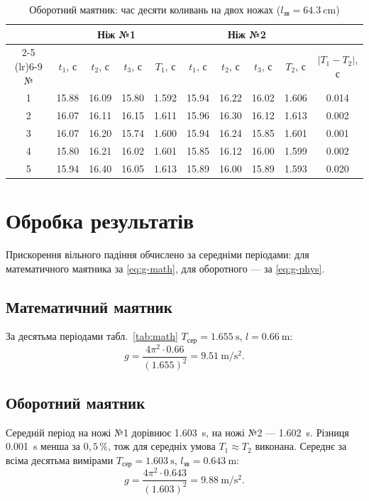 \documentclass[ukrainian]{ucaphyslab}
\begin{document}
\begin{table}[H]
  \centering
  \small
  \setlength{\tabcolsep}{4pt}
  \begin{tabular}{@{}c ccc c ccc c c@{}}
    \toprule
    & \multicolumn{4}{c}{Ніж №1} & \multicolumn{4}{c}{Ніж №2} & \\
    \cmidrule(lr){2-5} \cmidrule(lr){6-9}
    № & \(t_1\), с & \(t_2\), с & \(t_3\), с & \(T_1\), с
      & \(t_1\), с & \(t_2\), с & \(t_3\), с & \(T_2\), с
      & \(|T_1-T_2|\), с \\
    \midrule
    1 & 15.88 & 16.09 & 15.80 & 1.592 & 15.94 & 16.22 & 16.02 & 1.606 & 0.014 \\
    2 & 16.07 & 16.11 & 16.15 & 1.611 & 15.96 & 16.30 & 16.12 & 1.613 & 0.002 \\
    3 & 16.07 & 16.20 & 15.74 & 1.600 & 15.94 & 16.24 & 15.85 & 1.601 & 0.001 \\
    4 & 15.80 & 16.21 & 16.02 & 1.601 & 15.85 & 16.12 & 16.00 & 1.599 & 0.002 \\
    5 & 15.94 & 16.40 & 16.05 & 1.613 & 15.89 & 16.00 & 15.89 & 1.593 & 0.020 \\
    \bottomrule
  \end{tabular}
  \caption{Оборотний маятник: час десяти коливань на двох ножах (\(l_{\text{зв}} = \SI{64.3}{\centi\meter}\))}
  \label{tab:phys}
\end{table}

\section{Обробка результатів}
Прискорення вільного падіння обчислено за середніми періодами: для математичного маятника за \eqref{eq:g-math}, для оборотного — за \eqref{eq:g-phys}.

\subsection{Математичний маятник}
За десятьма періодами табл.~\ref{tab:math} \(T_\text{сер} = \SI{1.655}{\second}\), \(l = \SI{0.66}{\meter}\):
\begin{equation}
  g = \frac{4\pi^{2}\cdot \num{0.66}}{(\num{1.655})^{2}} = \SI{9.51}{\meter\per\second\squared}.
  \label{eq:g-math-num}
\end{equation}

\subsection{Оборотний маятник}
Середній період на ножі №1 дорівнює \SI{1.603}{\second}, на ножі №2 — \SI{1.602}{\second}. Різниця \SI{0.001}{\second} менша за \(0{,}5\,\%\), тож для середніх умова \(T_1 \approx T_2\) виконана. Середнє за всіма десятьма вимірами \(T_\text{сер} = \SI{1.603}{\second}\), \(l_{\text{зв}} = \SI{0.643}{\meter}\):
\begin{equation}
  g = \frac{4\pi^{2}\cdot \num{0.643}}{(\num{1.603})^{2}} = \SI{9.88}{\meter\per\second\squared}.
  \label{eq:g-phys-num}
\end{equation}
\end{document}

